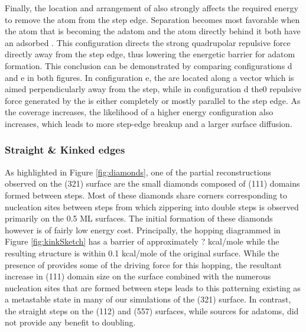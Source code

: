 Finally, the location and arrangement of  also strongly affects the
required energy to remove the atom from the step edge. Separation becomes most
favorable when the atom that is becoming the adatom and the atom directly
behind it both have an adsorbed . This configuration directs the strong
quadrupolar repulsive force directly away from the step edge, thus lowering the
energetic barrier for adatom formation.  This conclusion can be demonstrated by
comparing configurations d and e in both figures. In configuration e, the
 are located along a vector which is aimed perpendicularly away from the
step, while in configuration d the0 repulsive force generated by the  is
either completely or mostly parallel to the step edge. As the coverage
increases, the likelihood of a higher energy configuration also increases,
which leads to more step-edge breakup and a larger surface diffusion.

\subsubsection{Straight \& Kinked edges}
As highlighted in Figure \ref{fig:diamonds}, one of the partial reconstructions
observed on the (321) surface are the small diamonds composed of (111) domains
formed between steps. Most of these diamonds share corners corresponding to
nucleation sites between steps from which zippering into double steps is
observed primarily on the 0.5 ML surfaces. The initial formation of these
diamonds however is of fairly low energy cost. Principally, the hopping
diagrammed in Figure \ref{fig:kinkSketch} has a barrier of approximately ?
kcal/mole while the resulting structure is within 0.1 kcal/mole of the original
surface. While the presence of  provides some of the driving force for
this hopping, the resultant increase in (111) domain size on the surface
combined with the numerous nucleation sites that are formed between steps leads
to this patterning existing as a metastable state in many of our simulations of
the (321) surface. In contrast, the straight steps on the (112) and (557)
surfaces, while sources for adatoms, did not provide any benefit to doubling.

